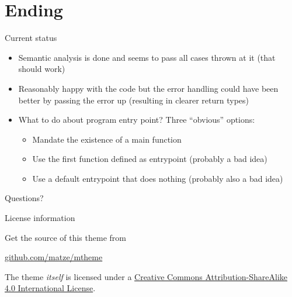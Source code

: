 \documentclass[10pt]{beamer}
\begin{document}
\section{Ending}
\begin{frame}{Current status}
    \begin{itemize}
        \item Semantic analysis is done and seems to pass all cases thrown at it (that should work)
        \item Reasonably happy with the code but the error handling could have been better by passing the error up (resulting in clearer return types)
        \item What to do about program entry point? Three ``obvious'' options:
        \begin{itemize}
            \item Mandate the existence of a main function
            \item Use the first function defined as entrypoint (probably a bad idea)
            \item Use a default entrypoint that does nothing (probably also a bad idea)
        \end{itemize}
    \end{itemize}
\end{frame}

{
\begin{frame}[standout]
  Questions?
\end{frame}
}

\begin{frame}{License information}

  Get the source of this theme from

  \begin{center}\url{github.com/matze/mtheme}\end{center}

  The theme \emph{itself} is licensed under a
  \href{http://creativecommons.org/licenses/by-sa/4.0/}{Creative Commons
  Attribution-ShareAlike 4.0 International License}.

  \begin{center}\ccbysa\end{center}

\end{frame}
\end{document}

